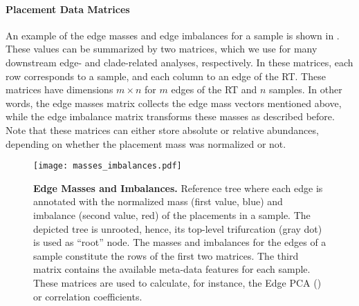 \paragraph{Placement Data Matrices}
\label{ch:Foundations:sec:PhylogeneticPlacement:sub:PlacementProcessing:par:PlacementDataMatrices}

An example of the edge masses and edge imbalances for a sample is shown in .
These values can be summarized by two matrices,
which we use for many downstream edge- and clade-related analyses, respectively.
In these matrices, each row corresponds to a sample, and each column to an edge of the \ac{RT}.
These matrices have dimensions $m \times n$ for $m$ edges of the \ac{RT} and $n$ samples.
In other words, the edge masses matrix collects the edge mass vectors mentioned above,
while the edge imbalance matrix transforms these masses as described before.
Note that these matrices can either store absolute or relative abundances,
depending on whether the placement mass was normalized or not.

\begin{figure}[!htb]
    \centering
    \texttt{[image: masses\_imbalances.pdf]}
    \begin{subfigure}{0pt}
        \label{fig:masses_imbalances:sub:ReferenceTree}
    \end{subfigure}
    \begin{subfigure}{0pt}
        \label{fig:masses_imbalances:sub:Matrices}
    \end{subfigure}
    \caption[Edge masses and imbalances]{
        \textbf{Edge Masses and Imbalances.}
        Reference tree where each edge is annotated with the normalized mass (first value, blue) and
        imbalance (second value, red) of the placements in a sample.
        The depicted tree is unrooted, hence, its top-level trifurcation (gray dot) is used as ``root'' node.
        The masses and imbalances for the edges of a sample constitute the rows of the first two matrices.
        The third matrix contains the available meta-data features for each sample.
        These matrices are used to calculate, for instance, the Edge PCA
        () or correlation coefficients.
    }
    \label{fig:masses_imbalances}
\end{figure}

